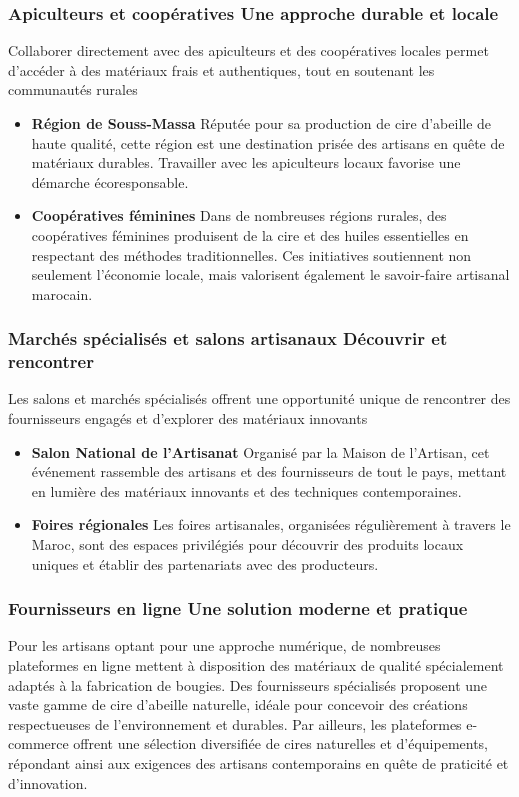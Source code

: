 \documentclass[11pt,fleqn,onecolumn,oneside]{book}
\begin{document}
\subsubsection*{Apiculteurs et coopératives Une approche durable et locale}
Collaborer directement avec des apiculteurs et des coopératives locales permet d’accéder à des matériaux frais et authentiques, tout en soutenant les communautés rurales
\begin{itemize}
    \item \textbf{Région de Souss-Massa} Réputée pour sa production de cire d’abeille de haute qualité, cette région est une destination prisée des artisans en quête de matériaux durables. Travailler avec les apiculteurs locaux favorise une démarche écoresponsable.
    \item \textbf{Coopératives féminines} Dans de nombreuses régions rurales, des coopératives féminines produisent de la cire et des huiles essentielles en respectant des méthodes traditionnelles. Ces initiatives soutiennent non seulement l’économie locale, mais valorisent également le savoir-faire artisanal marocain.
\end{itemize}

\subsubsection*{Marchés spécialisés et salons artisanaux Découvrir et rencontrer}
Les salons et marchés spécialisés offrent une opportunité unique de rencontrer des fournisseurs engagés et d'explorer des matériaux innovants
\begin{itemize}
    \item \textbf{Salon National de l'Artisanat} Organisé par la Maison de l'Artisan, cet événement rassemble des artisans et des fournisseurs de tout le pays, mettant en lumière des matériaux innovants et des techniques contemporaines.
    \item \textbf{Foires régionales} Les foires artisanales, organisées régulièrement à travers le Maroc, sont des espaces privilégiés pour découvrir des produits locaux uniques et établir des partenariats avec des producteurs.
\end{itemize}

\subsubsection*{Fournisseurs en ligne Une solution moderne et pratique}
Pour les artisans optant pour une approche numérique, de nombreuses plateformes en ligne mettent à disposition des matériaux de qualité spécialement adaptés à la fabrication de bougies. Des fournisseurs spécialisés proposent une vaste gamme de cire d’abeille naturelle, idéale pour concevoir des créations respectueuses de l’environnement et durables. Par ailleurs, les plateformes e-commerce offrent une sélection diversifiée de cires naturelles et d’équipements, répondant ainsi aux exigences des artisans contemporains en quête de praticité et d’innovation.
\end{document}
